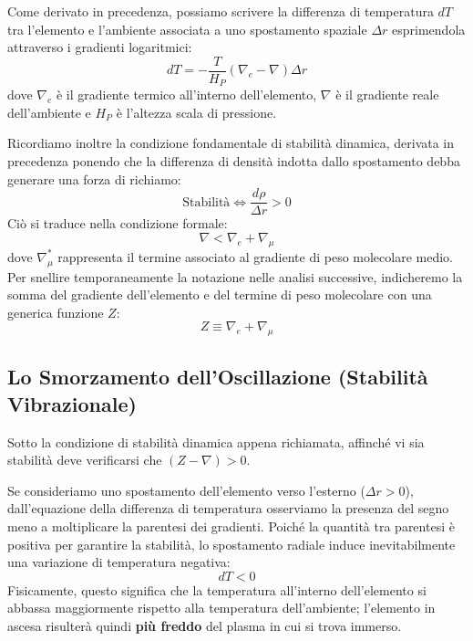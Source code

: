 Come derivato in precedenza, possiamo scrivere la differenza di temperatura $dT$ tra l'elemento e l'ambiente associata a uno spostamento spaziale $\Delta r$ esprimendola attraverso i gradienti logaritmici:
\begin{equation}
dT = - \frac{T}{H_P} \left( \nabla_e - \nabla \right) \Delta r
\end{equation}
dove $\nabla_e$ è il gradiente termico all'interno dell'elemento, $\nabla$ è il gradiente reale dell'ambiente e $H_P$ è l'altezza scala di pressione.

Ricordiamo inoltre la condizione fondamentale di stabilità dinamica, derivata in precedenza ponendo che la differenza di densità indotta dallo spostamento debba generare una forza di richiamo:
\begin{equation}
\text{Stabilità} \iff \frac{d\rho}{\Delta r} > 0
\end{equation}
Ciò si traduce nella condizione formale:
\begin{equation}
\nabla < \nabla_e + \nabla_\mu
\end{equation}
dove $\nabla_\mu^*$ rappresenta il termine associato al gradiente di peso molecolare medio. Per snellire temporaneamente la notazione nelle analisi successive, indicheremo la somma del gradiente dell'elemento e del termine di peso molecolare con una generica funzione $Z$:
\begin{equation}
Z \equiv \nabla_e + \nabla_\mu
\end{equation}

\subsection{Lo Smorzamento dell'Oscillazione (Stabilità Vibrazionale)}

Sotto la condizione di stabilità dinamica appena richiamata, affinché vi sia stabilità deve verificarsi che $\left(Z - \nabla\right) > 0$.

Se consideriamo uno spostamento dell'elemento verso l'esterno ($\Delta r > 0$), dall'equazione della differenza di temperatura osserviamo la presenza del segno meno a moltiplicare la parentesi dei gradienti. Poiché la quantità tra parentesi è positiva per garantire la stabilità, lo spostamento radiale induce inevitabilmente una variazione di temperatura negativa:
\begin{equation}
dT < 0
\end{equation}
Fisicamente, questo significa che la temperatura all'interno dell'elemento si abbassa maggiormente rispetto alla temperatura dell'ambiente; l'elemento in ascesa risulterà quindi \textbf{più freddo} del plasma in cui si trova immerso.


